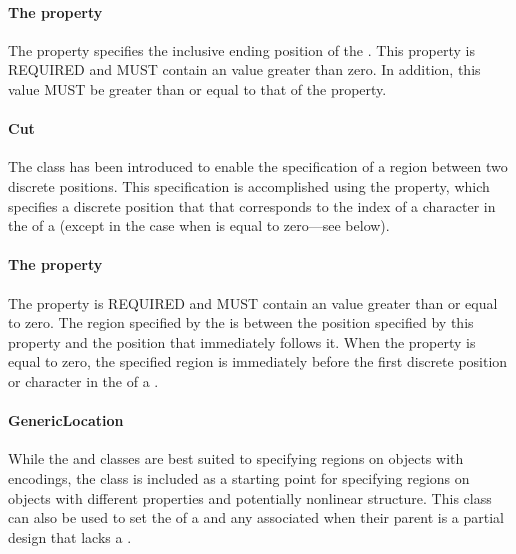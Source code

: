 \paragraph{The  property}\label{sec:end}
The  property specifies the inclusive ending position of the . This property is REQUIRED and MUST contain an  value greater than zero. In addition, this  value MUST be greater than or equal to that of the  property.

\paragraph{Cut}
\label{sec:Cut}
The  class has been introduced to enable the specification of a region between two discrete positions.
This specification is accomplished using the  property, which specifies a discrete position that that corresponds to the index of a character in the   of a  (except in the case when  is equal to zero---see below).

\paragraph{The  property}
\label{sec:at}
The  property is REQUIRED and MUST contain an  value greater than or equal to zero. The region specified by the  is between the position specified by this property and the position that immediately follows it. When the  property is equal to zero, the specified region is immediately before the first discrete position or character in the   of a .

\paragraph{GenericLocation}
\label{sec:GenericLocation}

While the  and  classes are best suited to
specifying regions on  objects with  encodings, the
 class is included as a starting point for specifying regions on  objects with different  properties and potentially nonlinear structure. This class can also be used to set the  of a  and any associated  when their parent  is a partial design that lacks a .

